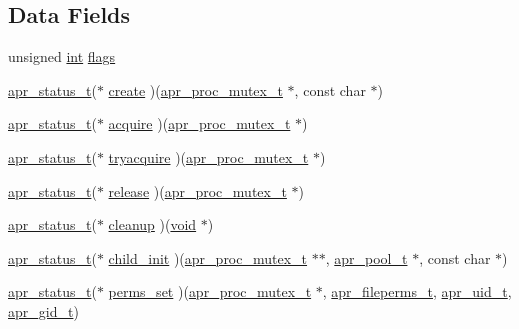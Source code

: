\subsection*{Data Fields}
\begin{DoxyCompactItemize}
\item 
unsigned \hyperlink{pcre_8txt_a42dfa4ff673c82d8efe7144098fbc198}{int} \hyperlink{structapr__proc__mutex__unix__lock__methods__t_a6db1f8e2a00c855f7cde7a9f02a33e93}{flags}
\item 
\hyperlink{group__apr__errno_gaa5105fa83cc322f09382292db8b47593}{apr\+\_\+status\+\_\+t}($\ast$ \hyperlink{structapr__proc__mutex__unix__lock__methods__t_adff971001c345f71cb55c863f122d804}{create} )(\hyperlink{structapr__proc__mutex__t}{apr\+\_\+proc\+\_\+mutex\+\_\+t} $\ast$, const char $\ast$)
\item 
\hyperlink{group__apr__errno_gaa5105fa83cc322f09382292db8b47593}{apr\+\_\+status\+\_\+t}($\ast$ \hyperlink{structapr__proc__mutex__unix__lock__methods__t_afc7ab04e37ad9891ab2f73fd82f257f6}{acquire} )(\hyperlink{structapr__proc__mutex__t}{apr\+\_\+proc\+\_\+mutex\+\_\+t} $\ast$)
\item 
\hyperlink{group__apr__errno_gaa5105fa83cc322f09382292db8b47593}{apr\+\_\+status\+\_\+t}($\ast$ \hyperlink{structapr__proc__mutex__unix__lock__methods__t_ad5927c725ef331034e1da7a35dc12402}{tryacquire} )(\hyperlink{structapr__proc__mutex__t}{apr\+\_\+proc\+\_\+mutex\+\_\+t} $\ast$)
\item 
\hyperlink{group__apr__errno_gaa5105fa83cc322f09382292db8b47593}{apr\+\_\+status\+\_\+t}($\ast$ \hyperlink{structapr__proc__mutex__unix__lock__methods__t_aa669af2ceed9e271585d8d3989bdbaa2}{release} )(\hyperlink{structapr__proc__mutex__t}{apr\+\_\+proc\+\_\+mutex\+\_\+t} $\ast$)
\item 
\hyperlink{group__apr__errno_gaa5105fa83cc322f09382292db8b47593}{apr\+\_\+status\+\_\+t}($\ast$ \hyperlink{structapr__proc__mutex__unix__lock__methods__t_aef52d01928a52294871cd46b7c5f4ed5}{cleanup} )(\hyperlink{group__MOD__ISAPI_gacd6cdbf73df3d9eed42fa493d9b621a6}{void} $\ast$)
\item 
\hyperlink{group__apr__errno_gaa5105fa83cc322f09382292db8b47593}{apr\+\_\+status\+\_\+t}($\ast$ \hyperlink{structapr__proc__mutex__unix__lock__methods__t_ad007a049dbf527c863bd3a93d3083b60}{child\+\_\+init} )(\hyperlink{structapr__proc__mutex__t}{apr\+\_\+proc\+\_\+mutex\+\_\+t} $\ast$$\ast$, \hyperlink{structapr__pool__t}{apr\+\_\+pool\+\_\+t} $\ast$, const char $\ast$)
\item 
\hyperlink{group__apr__errno_gaa5105fa83cc322f09382292db8b47593}{apr\+\_\+status\+\_\+t}($\ast$ \hyperlink{structapr__proc__mutex__unix__lock__methods__t_a9f8a940290c0a2d0805a9440ffda26ac}{perms\+\_\+set} )(\hyperlink{structapr__proc__mutex__t}{apr\+\_\+proc\+\_\+mutex\+\_\+t} $\ast$, \hyperlink{group__apr__file__info_ga3af19c4c47007169064a70f9351bc7d8}{apr\+\_\+fileperms\+\_\+t}, \hyperlink{group__apr__user_gad1aa508f584bc230acf4f68ba4fc4de7}{apr\+\_\+uid\+\_\+t}, \hyperlink{group__apr__user_ga22e9e224e984f837f3e276833e2f3a55}{apr\+\_\+gid\+\_\+t})
$$
\end{DoxyCompactItemize}
